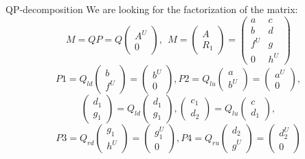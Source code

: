 \documentclass[pdf]{beamer}
\begin{document}
\begin{frame}{ QP-decomposition}
  We are looking for the factorization of the matrix:
 $$M = QP = Q \left (\begin {array} {c} A ^ U \\ 0 \end {array} \right), \ \ M= \left(\begin{array}{c}A  \\ R_{1}  \end{array}\right)  = \left(\begin{array}{cc}a & c \\ b & d \\ f^U & g \\ 0 & h^U \end{array}\right) $$
%
 $$P1= Q_{ld}  \left(\begin{array}{c}b \\ f^U \end{array}\right) =  \left(\begin{array}{c}b^U \\ 0 \end{array}\right) , P2= Q_{lu}  \left(\begin{array}{c}a \\ b^U \end{array}\right) = \left(\begin{array}{c}a^U \\ 0 \end{array}\right) , $$
 $$  \left(\begin{array}{c}d_{1} \\ g_{1} \end{array}\right) =Q_{ld} \left(\begin{array}{c}d_{1} \\ g_{1} \end{array}\right) ,   \left(\begin{array}{c}c_{1} \\ d_{2} \end{array}\right) =Q_{lu} \left(\begin{array}{c}c  \\ d_{1} \end{array}\right) ,$$
 $$P3= Q_{rd}  \left(\begin{array}{c}g_{1}  \\ h^U \end{array}\right) =  \left(\begin{array}{c}g_{1}^U \\ 0 \end{array}\right) , P4= Q_{ru}  \left(\begin{array}{c}d_{2} \\ g^U \end{array}\right) = \left(\begin{array}{c}d_{2} ^U \\ 0 \end{array}\right) $$

\end{frame}
\end{document}
